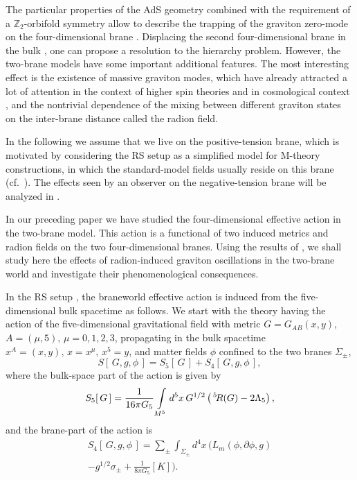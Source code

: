 \documentclass[a4paper,prl,twocolumn,amsmath,amssymb,showpacs]{revtex4}
\begin{document}
The particular properties of the AdS geometry combined with the requirement of 
a ${\mathbb Z}_2$-orbifold symmetry allow to describe the trapping of the 
graviton zero-mode 
on the four-dimensional brane \cite{RS2}. 
Displacing the second four-dimensional brane in the bulk \cite{RS1}, one can 
propose a resolution to the hierarchy problem.  However, the two-brane models 
have some important additional features.   
The most interesting effect is the existence of massive graviton modes, 
which have already attracted a lot of attention in the context of higher 
spin theories and in cosmological context \cite{Vas,Deser},  
and the nontrivial dependence of 
the mixing between different graviton states on the inter-brane distance 
called the radion field.  
 
In the following we assume that we live on the positive-tension 
brane, which is motivated by considering the RS setup as a simplified model 
for M-theory constructions, in which the standard-model fields usually reside 
on this brane (cf.\ \cite{Pyr}). The effects seen by an observer on the 
negative-tension brane will be analyzed in \cite{tocome}. 
 
In our preceding 
paper \cite{we} we have studied the four-dimensional effective action in the 
two-brane model.  This action is a functional of two induced metrics 
and radion fields on the two four-dimensional 
branes.  Using the results of \cite{we}, we shall study here 
the effects of radion-induced graviton oscillations  
in the two-brane world and investigate their phenomenological consequences. 
  
In the RS setup \cite{RS1}, the braneworld effective action is induced from 
the five-dimensional bulk spacetime as follows. We start with the theory 
having the action of the five-dimensional gravitational field with metric 
$G=G_{AB}(x,y)$, $A=(\mu,5),\,\mu=0,1,2,3$, propagating in the bulk spacetime 
$x^A=(x,y),\,x=x^\mu,\,x^5=y$, and matter fields $\phi$ confined to the two 
branes $\Sigma_\pm$, 
\begin{equation}
S[\,G,g,\phi\,]=S_5[\,G\,] + S_4[\,G,g,\phi\,], \label{action}
\end{equation}
where the bulk-space part of the action is given by
\begin{equation}
     S_5[\,G\,]=\frac1{16\pi G_5} 
     \int\limits_{M^5} d^5x\,G^{1/2} 
     \left(\,\vphantom{I}^5\!R(G)-2\Lambda_5\right),  \label{action1} 
\end{equation} 
and the brane-part of the action is
      \begin{multline} 
     S_4[\,G,g,\phi\,]=
     \sum\limits_{\pm}\int_{\Sigma_\pm}\! 
     d^4x\,\Big( L_m(\phi,\partial\phi,g)  \\ 
     -g^{1/2}\sigma_\pm
     + \frac1{8\pi G_5}[K]\Big). \label{actionbr}
     \end{multline}
\end{document}
